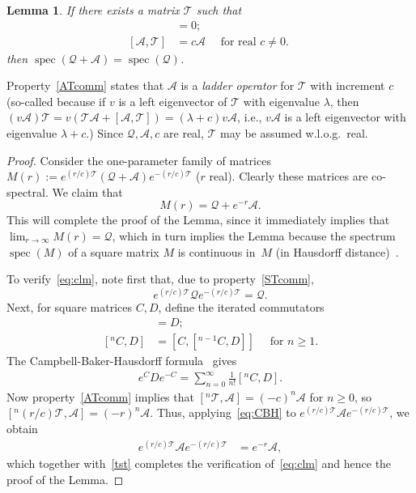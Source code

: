 \documentclass[11pt]{article}
\theoremstyle{plain}
\newtheorem{lemma}[theorem]{Lemma}
\theoremstyle{definition}
\theoremstyle{remark}
\numberwithin{equation}{section}
\newcommand{\cA}{{\mathcal A}}
\newcommand{\cS}{{\mathcal S}}
\newcommand{\cT}{{\mathcal T}}
\newcommand{\be}{\begin{equation}}
\newcommand{\ee}{\end{equation}}
\DeclareMathOperator{\spec}{spec}
\renewcommand{\cS}{{\mathcal Q}}
\begin{document}
\begin{lemma} If there exists a matrix $\cT$ such that 
\begin{align} [\cS,\cT]&=0 \label{STcomm}; \\
 [\cA,\cT]&=c \cA \quad \text{ for real $c \neq 0$. } \label{ATcomm} \end{align}
 then $\spec(\cS+\cA)=\spec(\cS)$. \label{STA} \end{lemma}
Property~\ref{ATcomm} states that $\cA$ is a {\it ladder operator\/} for $\cT$ with increment $c$
(so-called because if $v$ is a left eigenvector of $\cT$ with eigenvalue $\lambda$, then 
$(v \cA) \cT = v (\cT \cA +  [\cA,\cT]) =(\lambda+c) v \cA$, i.e., $v \cA$ is a left eigenvector with eigenvalue $\lambda+c$.) 
Since $\cS,\cA,c$ are real, $\cT$ may be assumed w.l.o.g.\ real.
 
\begin{proof} Consider the one-parameter family of matrices $M(r):=e^{(r/c) \cT}(\cS+\cA)e^{-(r/c) \cT}$ ($r$ real). 
Clearly these matrices are co-spectral. We claim that
\begin{equation}\label{eq:clm}
M(r)=\cS+e^{-r}\cA.
\end{equation}
This will complete the proof of the Lemma, since it immediately implies that $\lim_{r \to \infty} M(r)=\cS$,
which in turn implies the Lemma because the spectrum $\spec(M)$ of a square matrix $M$ is continuous 
in~$M$ (in Hausdorff distance)~\cite[VIII.3]{Bhatia97}.

To verify~\eqref{eq:clm}, note first that, due to property~\eqref{STcomm}, 
\be e^{(r/c)\cT}\cS e^{-(r/c) \cT}=\cS. \label{tst} \ee
Next, for square matrices $C,D$, define the iterated commutators
\begin{align} [^0C,D]&=D; \\ [^nC,D]& =[C,[^{n-1}C,D]] \quad \text{ for } n\geq 1. \end{align} 
The Campbell-Baker-Hausdorff formula~\cite{Sternberg04,FSchur1889} gives
\begin{align}\label{eq:CBH} e^C D e^{-C} = \sum_{n=0}^\infty \frac{1}{n!} [^nC,D]. \end{align}
Now property~\eqref{ATcomm} implies that $[^n\cT,\cA]=(-c)^n \cA$ for $n\geq 0$,
so $[^n(r/c) \cT,\cA]=(-r)^n \cA$.  Thus, applying~\eqref{eq:CBH} to $e^{(r/c) \cT}\cA e^{-(r/c) \cT}$,
we obtain
\begin{align} e^{(r/c)\cT}\cA e^{-(r/c)\cT} &= e^{-r} \cA, \label{tat} \end{align}
which together with~\eqref{tst} completes the verification of~\eqref{eq:clm} and hence the proof of the Lemma.
\end{proof}
\end{document}

